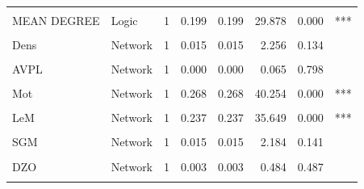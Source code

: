 \documentclass[preprint,
3p]{elsarticle} %
\begin{document}
\begin{longtable}[t]{llrrrrrl}
\cellcolor{gray!10}{COMPS} & \cellcolor{gray!10}{Logic} & \cellcolor{gray!10}{1} & \cellcolor{gray!10}{0.009} & \cellcolor{gray!10}{0.009} & \cellcolor{gray!10}{1.334} & \cellcolor{gray!10}{0.249} & \cellcolor{gray!10}{}\\
MEAN DEGREE & Logic & 1 & 0.199 & 0.199 & 29.878 & 0.000 & ***\\
\cellcolor{gray!10}{NARC} & \cellcolor{gray!10}{Logic} & \cellcolor{gray!10}{1} & \cellcolor{gray!10}{0.020} & \cellcolor{gray!10}{0.020} & \cellcolor{gray!10}{2.979} & \cellcolor{gray!10}{0.086} & \cellcolor{gray!10}{.}\\
Dens & Network & 1 & 0.015 & 0.015 & 2.256 & 0.134 & \\
\addlinespace
\cellcolor{gray!10}{Diam} & \cellcolor{gray!10}{Network} & \cellcolor{gray!10}{1} & \cellcolor{gray!10}{0.137} & \cellcolor{gray!10}{0.137} & \cellcolor{gray!10}{20.527} & \cellcolor{gray!10}{0.000} & \cellcolor{gray!10}{***}\\
AVPL & Network & 1 & 0.000 & 0.000 & 0.065 & 0.798 & \\
\cellcolor{gray!10}{VAs} & \cellcolor{gray!10}{Network} & \cellcolor{gray!10}{1} & \cellcolor{gray!10}{0.018} & \cellcolor{gray!10}{0.018} & \cellcolor{gray!10}{2.643} & \cellcolor{gray!10}{0.105} & \cellcolor{gray!10}{}\\
Mot & Network & 1 & 0.268 & 0.268 & 40.254 & 0.000 & ***\\
\cellcolor{gray!10}{ASSORT} & \cellcolor{gray!10}{Network} & \cellcolor{gray!10}{1} & \cellcolor{gray!10}{0.263} & \cellcolor{gray!10}{0.263} & \cellcolor{gray!10}{39.416} & \cellcolor{gray!10}{0.000} & \cellcolor{gray!10}{***}\\
\addlinespace
LeM & Network & 1 & 0.237 & 0.237 & 35.649 & 0.000 & ***\\
\cellcolor{gray!10}{IM} & \cellcolor{gray!10}{Network} & \cellcolor{gray!10}{1} & \cellcolor{gray!10}{0.200} & \cellcolor{gray!10}{0.200} & \cellcolor{gray!10}{29.952} & \cellcolor{gray!10}{0.000} & \cellcolor{gray!10}{***}\\
SGM & Network & 1 & 0.015 & 0.015 & 2.184 & 0.141 & \\
\cellcolor{gray!10}{DZI} & \cellcolor{gray!10}{Network} & \cellcolor{gray!10}{1} & \cellcolor{gray!10}{0.031} & \cellcolor{gray!10}{0.031} & \cellcolor{gray!10}{4.597} & \cellcolor{gray!10}{0.033} & \cellcolor{gray!10}{*}\\
DZO & Network & 1 & 0.003 & 0.003 & 0.484 & 0.487 & \\
\addlinespace
\cellcolor{gray!10}{DZ} & \cellcolor{gray!10}{Network} & \cellcolor{gray!10}{1} & \cellcolor{gray!10}{0.160} & \cellcolor{gray!10}{0.160} & \cellcolor{gray!10}{24.010} & \cellcolor{gray!10}{0.000} & \cellcolor{gray!10}{***}\\

\end{longtable}
\end{document}
